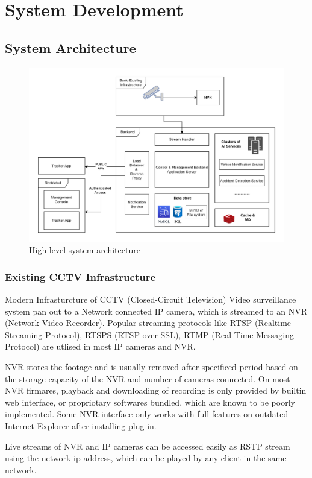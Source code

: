 \chapter{System Development}


\section{System Architecture}

\begin{figure}
	\centering
	\includegraphics[width=0.8\linewidth]{Images/architecture_high_level}
	\caption{High level system architecture}
	\label{fig:architecturehighlevel}
\end{figure}


\subsection{Existing CCTV Infrastructure}
Modern Infrasturcture of CCTV (Closed-Circuit Television) Video surveillance system pan out to a Network connected IP camera, which is streamed to an NVR (Network Video Recorder). Popular streaming protocols like RTSP (Realtime Streaming Protocol), RTSPS (RTSP over SSL), RTMP (Real-Time Messaging Protocol) are utlised in most IP cameras and NVR. 

NVR stores the footage and is usually removed after specificed period based on the storage capacity of the NVR and number of cameras connected. On most NVR firmares, playback and downloading of recording is only provided by builtin web interface, or propriotary softwares bundled, which are known to be poorly implemented. Some NVR interface only works with full features on outdated Internet Explorer after installing plug-in.

Live streams of NVR and IP cameras can be accessed easily as RSTP stream using the network ip address, which can be played by any client in the same network.

